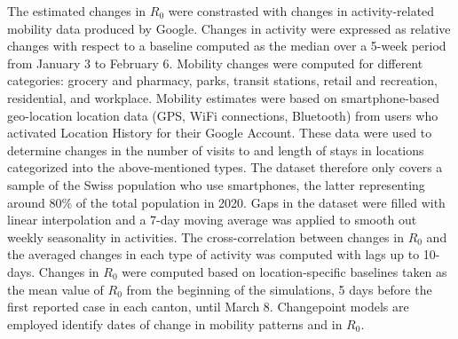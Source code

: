 The estimated changes in $R_0$  were constrasted with changes in activity-related mobility data produced by Google\cite{GoogleLLC:GoogleCOVID19Community:2020}. Changes in activity were expressed as relative changes with respect to a baseline computed as the median over a 5-week period from January 3 to February 6. Mobility changes were computed for different categories: grocery and pharmacy, parks, transit stations, retail and recreation, residential, and workplace. Mobility estimates were based on smartphone-based geo-location location data (GPS, WiFi connections, Bluetooth) from users who activated Location History for their Google Account. These data were used to determine changes in the number of visits to and length of stays in locations categorized into the above-mentioned types. The dataset therefore only covers a sample of the Swiss population who use smartphones, the latter representing around 80\% of the total population in 2020\cite{ODea:SmartphoneUsersSwitzerland:2020}. Gaps in the dataset were filled with linear interpolation and a 7-day moving average was applied to smooth out weekly seasonality in activities. The cross-correlation between changes in $R_0$ and the averaged changes in each type of activity was computed with lags up to 10-days. Changes in $R_0$ were computed based on location-specific baselines taken as the mean value of $R_0$ from the beginning of the simulations, 5 days before the first reported case in each canton, until March 8. Changepoint models are employed identify dates of change in mobility patterns and in $R_0$. 


